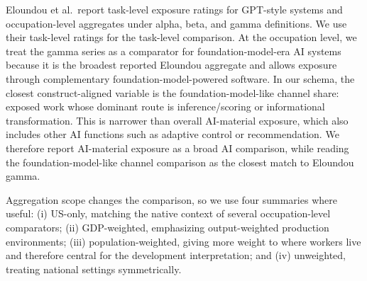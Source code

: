\documentclass[11pt]{article}
\begin{document}
Eloundou et al.\ report task-level exposure ratings for GPT-style systems and occupation-level aggregates under alpha, beta, and gamma definitions. We use their task-level ratings for the task-level comparison. At the occupation level, we treat the gamma series as a comparator for foundation-model-era AI systems because it is the broadest reported Eloundou aggregate and allows exposure through complementary foundation-model-powered software. In our schema, the closest construct-aligned variable is the foundation-model-like channel share: exposed work whose dominant route is inference/scoring or informational transformation. This is narrower than overall AI-material exposure, which also includes other AI functions such as adaptive control or recommendation. We therefore report AI-material exposure as a broad AI comparison, while reading the foundation-model-like channel comparison as the closest match to Eloundou gamma.

Aggregation scope changes the comparison, so we use four summaries where useful: (i) US-only, matching the native context of several occupation-level comparators; (ii) GDP-weighted, emphasizing output-weighted production environments; (iii) population-weighted, giving more weight to where workers live and therefore central for the development interpretation; and (iv) unweighted, treating national settings symmetrically.






\end{document}
